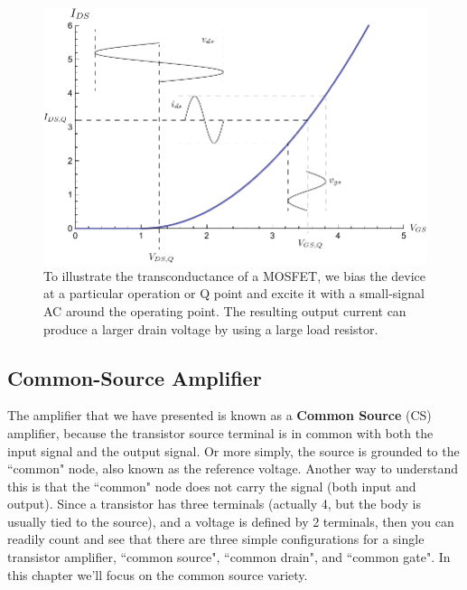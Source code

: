 \begin{figure}[tb]
\centering
\includegraphics[width=.75\columnwidth]{ids_vgs_vds}
\caption{To illustrate the transconductance of a MOSFET, we bias the device at a particular operation or Q point and excite it with a small-signal AC around the operating point.  The resulting output current can produce a larger drain voltage by using a large load resistor.}
\label{fig:ids_vgs_vds}
\end{figure}
\subsection{Common-Source Amplifier}
The amplifier that we have presented is known as a \textbf{Common Source} (CS) amplifier, because the transistor source terminal is in common with both the input signal and the output signal.  Or more simply, the source is grounded to the ``common" node, also known as the reference voltage.  Another way to understand this is that the ``common" node does not carry the signal (both input and output).  Since a transistor has three terminals (actually 4, but the body is usually tied to the source), and a voltage is defined by 2 terminals, then you can readily count and see that there are three simple configurations for a single transistor amplifier, ``common source", ``common drain", and ``common gate".  In this chapter we'll focus on the common source variety.
